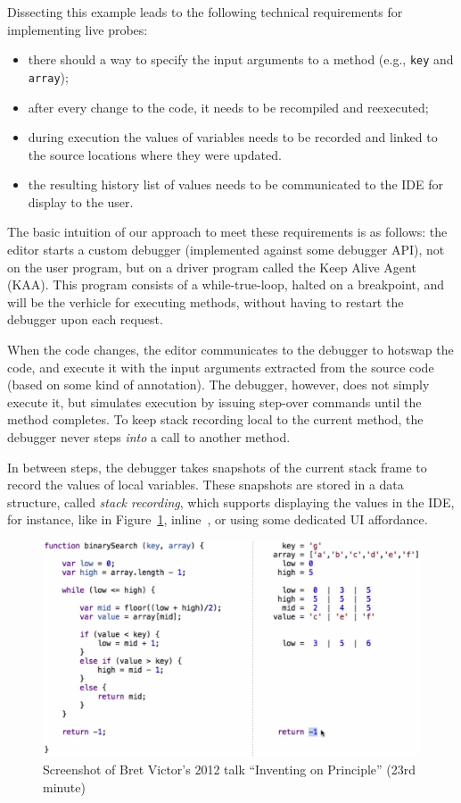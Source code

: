 \documentclass[english,submission]{programming}
\begin{document}
Dissecting this example leads to the following technical requirements for implementing live probes:
\begin{itemize}
  \item there should a way to specify the input arguments to a method (e.g., \lstinline{key} and \lstinline[language=c]{array});
  \item after every change to the code, it needs to be recompiled and reexecuted;
  \item during execution the values of variables needs to be recorded and linked to the source locations where they were updated.
  \item the resulting history list of values needs to be communicated to the IDE for display to the user.
\end{itemize}

The basic intuition of our approach to meet these requirements is as follows: the editor starts a custom debugger (implemented against some debugger API), not on the user program, but on a driver program called the Keep Alive Agent (KAA). This program consists of a while-true-loop, halted on a breakpoint, and will be the verhicle for executing methods, without having to restart the debugger upon each request. 

When the code changes, the editor communicates to the debugger to hotswap the code, and execute it with the input arguments extracted from the source code (based on some kind of annotation). The debugger, however, does not simply execute it, but simulates execution by issuing step-over commands until the method completes. To keep stack recording local to the current method, the debugger never steps \textit{into} a call to another method.

In between steps, the debugger takes snapshots of the current stack frame to record the values of local variables.  These snapshots are stored in a data structure, called \textit{stack recording}, which supports displaying the values in the IDE, for instance, like in Figure~\ref{FIG:bret}, inline~\cite{LiveLiterals,ExampleBasedGraalVM}, or using some dedicated UI affordance. 




\begin{figure}[t]
  \centering
  \includegraphics[width=\textwidth]{img/bret}
  \caption{Screenshot of Bret Victor's 2012 talk ``Inventing on Principle'' (23rd minute)~\cite{InventingOnPrinciple}}
  \label{FIG:bret}
\end{figure}
\end{document}
